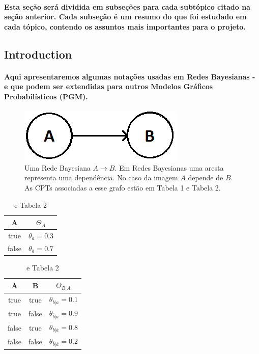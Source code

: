 \documentclass[a4paper,10pt]{article}
\theoremstyle{plain}
\begin{document}
\paragraph{
  Esta seção será dividida em subseções para cada subtópico citado na seção anterior. Cada 
subseção é um resumo do que foi estudado em cada tópico, contendo os assuntos mais importantes
para o projeto.
}

\subsection{Introduction}

\paragraph{
  Aqui apresentaremos algumas notações usadas em Redes Bayesianas - e que podem ser extendidas para
outros Modelos Gráficos Probabilísticos (PGM).
}

\begin{figure}[h]
\centering\includegraphics[scale=0.5]{imgs/fig1.png}
\caption{Uma Rede Bayesiana $A \to B$. Em Redes Bayesianas uma aresta representa uma dependência.
  No caso da imagem $A$ depende de $B$. As CPTs associadas a esse grafo estão em Tabela 1 e 
  Tabela 2.}
\end{figure}

\begin{table}[h]
\begin{center}
\captionsetup{justification=centering}
\caption{ e Tabela 2}
\begin{tabular}{c | c}
  A  & $\Theta_A$ \\
\hline
true & $\theta_a = 0.3$ \\
false& $\theta_{\overline{a}} = 0.7$ \\
\end{tabular}
\quad
\quad
\begin{tabular}{c c | c}
A & B & $\Theta_{B|A}$ \\
\hline
true & true & $\theta_{b|a} = 0.1$ \\
true & false & $\theta_{\overline{b}|a} = 0.9$ \\
false & true & $\theta_{b|\overline{a}} = 0.8$ \\
false & false & $\theta_{\overline{b}|\overline{a}} = 0.2$ \\
\end{tabular}
\end{center}
\end{table}
\end{document}
